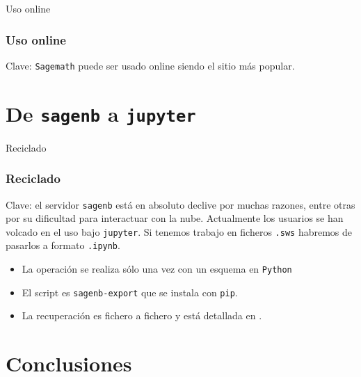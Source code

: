\documentclass[dvipsnames]{beamer}
\begin{document}
\begin{frame}[fragile]{Uso online}
  \frametitle{Uso online}
  \begin{block}{Clave: \texttt{Sagemath} puede ser usado online}
    siendo   el sitio
    más popular.
  \end{block}
\end{frame}

\section{De \texttt{sagenb} a \texttt{jupyter}}

\begin{frame}[fragile]{Reciclado}
  \frametitle{Reciclado}
  \begin{block}{Clave: el servidor \texttt{sagenb} está en absoluto
      declive por muchas razones, entre otras por su dificultad para
      interactuar con la nube.}
    Actualmente los usuarios se han volcado en el uso bajo
    \texttt{jupyter}. Si tenemos trabajo en ficheros \texttt{.sws}
    habremos de pasarlos a formato \texttt{.ipynb}.
  \end{block}\pause 
  \begin{itemize}[<+->]
  \item La operación se realiza sólo una vez con un esquema en
    \texttt{Python}
  \item El script es \texttt{sagenb-export} que se instala con
    \texttt{pip}.
  \item La recuperación es fichero a fichero y está detallada en
    .
  \end{itemize}
\end{frame}

\section{Conclusiones}
\end{document}
